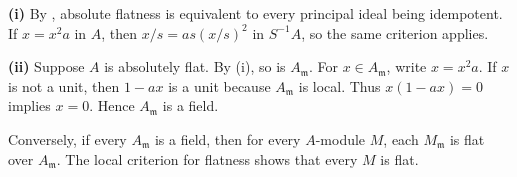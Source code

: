 \textbf{(i)} By , absolute flatness is equivalent to every principal ideal being idempotent. If $x=x^2a$ in $A$, then $x/s=as(x/s)^2$ in $S^{-1}A$, so the same criterion applies.

\textbf{(ii)} Suppose $A$ is absolutely flat. By (i), so is $A_{\mathfrak m}$. For $x\in A_{\mathfrak m}$, write $x=x^2a$. If $x$ is not a unit, then $1-ax$ is a unit because $A_{\mathfrak m}$ is local. Thus $x(1-ax)=0$ implies $x=0$. Hence $A_{\mathfrak m}$ is a field.

Conversely, if every $A_{\mathfrak m}$ is a field, then for every $A$-module $M$, each $M_{\mathfrak m}$ is flat over $A_{\mathfrak m}$. The local criterion for flatness shows that every $M$ is flat.
